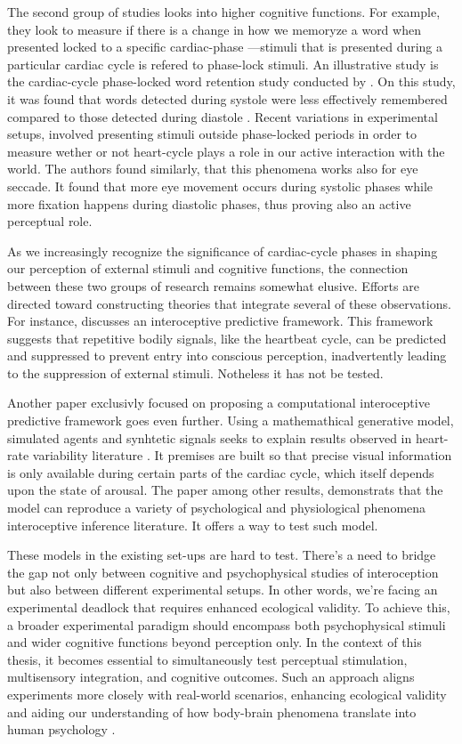 \documentclass[12pt,oneside,openright]{report}
\begin{document}
The second group of studies looks into higher cognitive functions. For example, they look to measure if there is a change in how we memoryze a word when presented locked to a specific cardiac-phase —stimuli that is presented during a particular cardiac cycle is refered to phase-lock stimuli. An illustrative study is the cardiac-cycle phase-locked word retention study conducted by \Cite{Garfinkel2013-st}. On this study, it was found that words detected during systole were less effectively remembered compared to those detected during diastole \parencite{Garfinkel2013-st}. Recent variations in experimental setups, involved presenting stimuli outside phase-locked periods  \parencite{GalvezPol2018ActiveSI} in order to measure wether or not heart-cycle plays a role in our active interaction with the world. The authors found similarly, that this phenomena works also for eye seccade. It found that more eye movement occurs during systolic phases while more fixation happens during diastolic phases, thus proving also an active perceptual role. 

As we increasingly recognize the significance of cardiac-cycle phases in shaping our perception of external stimuli and cognitive functions, the connection between these two groups of research remains somewhat elusive. Efforts are directed toward constructing theories that integrate several of these observations. For instance, \parencite{AL2021118247} discusses an interoceptive predictive framework. This framework suggests that repetitive bodily signals, like the heartbeat cycle, can be predicted and suppressed to prevent entry into conscious perception, inadvertently leading to the suppression of external stimuli. Notheless it has not be tested. 

Another paper exclusivly focused on proposing a computational interoceptive predictive framework goes even further. Using a mathemathical generative model, simulated agents and synhtetic signals seeks to explain results observed in heart-rate variability literature \parencite{Allen2022}. It premises are built so that precise visual information is only available during certain parts of the cardiac cycle, which itself depends upon the state of arousal. The paper among other results, demonstrats that the model can reproduce a variety of psychological and physiological phenomena interoceptive inference literature. It offers a way to test such model. 
 
These models in the existing set-ups are hard to test. There's a need to bridge the gap not only between cognitive and psychophysical studies of interoception but also between different experimental setups. In other words, we're facing an experimental deadlock that requires enhanced ecological validity. To achieve this, a broader experimental paradigm should encompass both psychophysical stimuli and wider cognitive functions beyond perception only. In the context of this thesis, it becomes essential to simultaneously test perceptual stimulation, multisensory integration, and cognitive outcomes. Such an approach aligns experiments more closely with real-world scenarios, enhancing ecological validity and aiding our understanding of how body-brain phenomena translate into human psychology \parencite{schmuckler2001ecological}.
\end{document}
